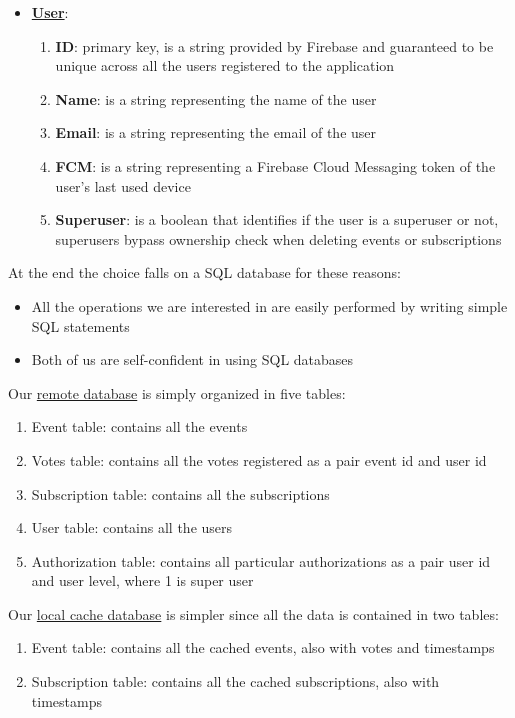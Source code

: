 \documentclass[a4paper]{scrreprt}
\begin{document}
\begin{itemize}
\item \underline{\textbf{User}}:
\begin{enumerate}
\item \textbf{ID}: primary key, is a string provided by Firebase and guaranteed to be unique across all the users registered to the application
\item \textbf{Name}:  is a string representing the name of the user
\item \textbf{Email}: is a string representing the email of the user
\item \textbf{FCM}: is a string representing a Firebase Cloud Messaging token of the user's last used device
\item \textbf{Superuser}: is a boolean that identifies if the user is a superuser or not, superusers bypass ownership check when deleting events or subscriptions
\end{enumerate}
\end{itemize}

\bigskip At the end the choice falls on a SQL database for these reasons:
\begin{itemize}
\item All the operations we are interested in are easily performed by writing simple SQL statements
\item Both of us are self-confident in using SQL databases
\end{itemize}

\bigskip Our \underline{remote database} is simply organized in five tables:
\begin{enumerate}
\item Event table: contains all the events
\item Votes table: contains all the votes registered as a pair event id and user id
\item Subscription table: contains all the subscriptions
\item User table: contains all the users
\item Authorization table: contains all particular authorizations as a pair user id and user level, where 1 is super user
\end{enumerate}

\par Our \underline{local cache database} is simpler since all the data is contained in two tables:
\begin {enumerate}
\item Event table: contains all the cached events, also with votes and timestamps
\item Subscription table: contains all the cached subscriptions, also with timestamps
\end{enumerate}
\end{document}
